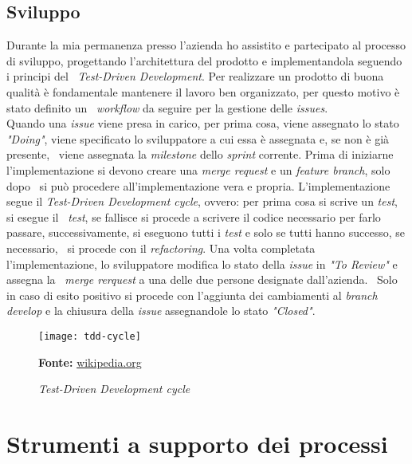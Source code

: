 \subsection{Sviluppo}
Durante la mia permanenza presso l'azienda ho assistito e partecipato al processo di sviluppo, progettando l'architettura del prodotto e implementandola seguendo i principi del \
\emph{Test-Driven Development}. Per realizzare un prodotto di buona qualità è fondamentale mantenere il lavoro ben organizzato, per questo motivo è stato definito un \
\emph{workflow} da seguire per la gestione delle \emph{issues}. \\

Quando una \emph{issue} viene presa in carico, per prima cosa, viene assegnato lo stato \emph{"Doing"}, viene specificato lo sviluppatore a cui essa è assegnata e, se non è già presente, \
viene assegnata la \emph{milestone} dello \emph{sprint} corrente. Prima di iniziarne l'implementazione si devono creare una \emph{merge request} e un \emph{feature branch}, solo dopo \
si può procedere all'implementazione vera e propria. L'implementazione segue il \emph{Test-Driven Development cycle}, ovvero: per prima cosa si scrive un \emph{test}, si esegue il \
\emph{test}, se fallisce si procede a scrivere il codice necessario per farlo passare, successivamente, si eseguono tutti i \emph{test} e solo se tutti hanno successo, se necessario, \
si procede con il \emph{refactoring}. Una volta completata l'implementazione, lo sviluppatore modifica lo stato della \emph{issue} in \emph{"To Review"} e assegna la \
\emph{merge rerquest} a una delle due persone designate dall'azienda. \
Solo in caso di esito positivo si procede con l'aggiunta dei cambiamenti al \emph{branch develop} e la chiusura della \emph{issue} assegnandole lo stato \emph{"Closed"}.

\begin{figure}[!ht]
  \begin{center}
    \texttt{[image: tdd-cycle]}
    \caption{\emph{Test-Driven Development cycle}}
    \textbf{Fonte:} \href{https://www.wikipedia.org}{wikipedia.org}
  \end{center}
\end{figure}

\section{Strumenti a supporto dei processi}

